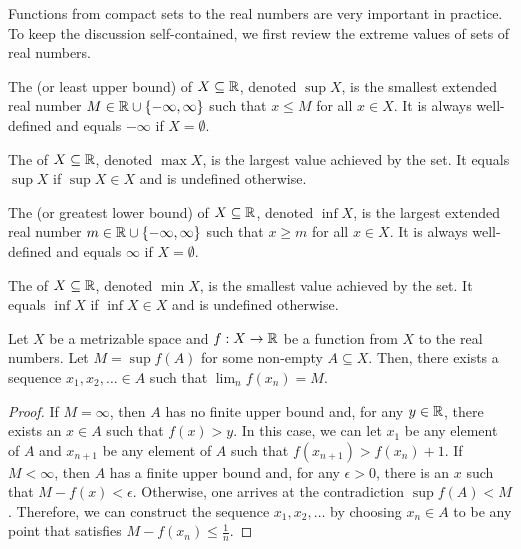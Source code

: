 Functions from compact sets to the real numbers are very important in practice.
To keep the discussion self-contained, we first review the extreme values of sets of real numbers.

\begin{definition}
The  (or least upper bound) of $X\subseteq \mathbb{R}$, denoted $\sup X$, is the smallest extended real number $M \in \mathbb{R} \cup \{-\infty,\infty\}$ such that $x\leq M$ for all $x\in X$.
It is always well-defined and equals $-\infty$ if $X=\emptyset$.
\end{definition}

\begin{definition}
The  of $X\subseteq \mathbb{R}$, denoted $\max X$, is the largest value achieved by the set.
It equals $\sup X$ if $\sup X \in X$ and is undefined otherwise.
\end{definition}

\begin{definition}
The  (or greatest lower bound) of $X\subseteq \mathbb{R}$, denoted $\inf X$, is the largest extended real number $m \in \mathbb{R} \cup \{-\infty,\infty\}$ such that $x\geq m$ for all $x\in X$.
It is always well-defined and equals $\infty$ if $X=\emptyset$.
\end{definition}

\begin{definition}
The  of $X\subseteq \mathbb{R}$, denoted $\min X$, is the smallest value achieved by the set.
It equals $\inf X$ if $\inf X \in X$ and is undefined otherwise.
\end{definition}

\begin{lemma}
\label{lem:SupremumSequence}
Let $X$ be a metrizable space and $f: X\rightarrow \mathbb{R}$ be a function from $X$ to the real numbers.
Let $M = \sup f(A)$ for some non-empty $A \subseteq X$.
Then, there exists a sequence $x_1,x_2,\ldots \in A$ such that $\lim_n f(x_n) = M$.
\end{lemma}
\begin{proof}
If $M=\infty$, then $A$ has no finite upper bound and, for any $y\in \mathbb{R}$, there exists an $x\in A$ such that $f(x)>y$.
In this case, we can let $x_1$ be any element of $A$ and $x_{n+1}$ be any element of $A$ such that $f(x_{n+1}) > f(x_n) + 1$.
If $M<\infty$, then $A$ has a finite upper bound and, for any $\epsilon >0$, there is an $x$ such that $M-f(x)<\epsilon$.
Otherwise, one arrives at the contradiction $\sup f(A) < M$.
Therefore, we can construct the sequence $x_1,x_2,\ldots$ by choosing $x_n\in A$ to be any point that satisfies $M-f(x_n)\leq \frac{1}{n}$.
\end{proof}

